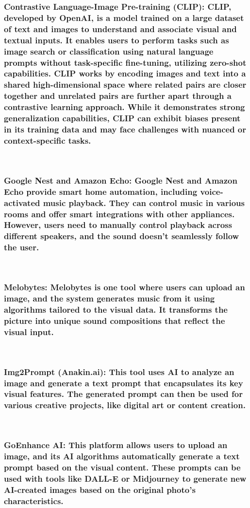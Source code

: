\documentclass[conference]{IEEEtran}
\begin{document}
\subsubsection{Contrastive Language-Image Pre-training (CLIP): CLIP, developed by OpenAI, is a model trained on a large dataset of text and images to understand and associate visual and textual inputs. It enables users to perform tasks such as image search or classification using natural language prompts without task-specific fine-tuning, utilizing zero-shot capabilities. CLIP works by encoding images and text into a shared high-dimensional space where related pairs are closer together and unrelated pairs are further apart through a contrastive learning approach. While it demonstrates strong generalization capabilities, CLIP can exhibit biases present in its training data and may face challenges with nuanced or context-specific tasks.}
\

\subsubsection{Google Nest and Amazon Echo: Google Nest and Amazon Echo provide smart home automation, including voice-activated music playback. They can control music in various rooms and offer smart integrations with other appliances. However, users need to manually control playback across different speakers, and the sound doesn’t seamlessly follow the user. }

\
\
\subsubsection{Melobytes: Melobytes is one tool where users can upload an image, and the system generates music from it using algorithms tailored to the visual data. It transforms the picture into unique sound compositions that reflect the visual input.}
\

\subsubsection{Img2Prompt (Anakin.ai): This tool uses AI to analyze an image and generate a text prompt that encapsulates its key visual features. The generated prompt can then be used for various creative projects, like digital art or content creation.}
\

\subsubsection{GoEnhance AI: This platform allows users to upload an image, and its AI algorithms automatically generate a text prompt based on the visual content. These prompts can be used with tools like DALL-E or Midjourney to generate new AI-created images based on the original photo's characteristics.}
\
\end{document}
